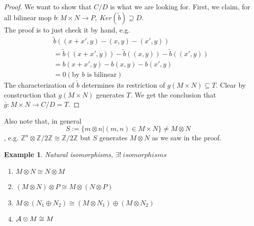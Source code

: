 \documentclass[11pt]{article}
\newtheorem{ex}[thm]{Example}
\newcommand{\intg}{\mathbb Z}
\newcommand{\cala}{{\cal A}}
\newcommand{\rta}{\rightarrow}
\begin{document}
\begin{proof}
We want to show that $C/D$ is what we are looking for. First, we claim, for all bilinear mop $ b:M\times N\rta P,\ Ker(\tilde{b})\supseteq D$.\\
The proof is to just check it by hand, e.g.
$$
\begin{aligned}
&\tilde{b}((x+x',y)-(x,y)-(x',y))\\
&=\tilde{b}((x+x',y))-\tilde{b}((x,y))-\tilde{b}((x',y))\\
&=b(x+x',y)-b(x,y)-b(x',y)\\
&=0(\text{by $b$ is bilinear})
\end{aligned}
$$
The characterization of $\tilde{b}$ determines its restriction of $g(M\times N)\subseteq T$. Clear by construction that $g(M\times N)$ generates $T$. We get the conclusion that $\bar{g}:M\times N\rta C/D=T$.
\end{proof}
Also note that, in general
$$
S:=\{m\otimes n|(m,n)\in M\times N\}\neq M\otimes N
$$, e.g. $\intg^n\otimes \intg/2\intg\cong \intg/2\intg$
but $S$ generates $M\otimes N$ as we saw in the proof.
\begin{ex}
Natural isomorphisms, $\exists !\ isomorphisms$
\begin{enumerate}
\item $M\otimes N\cong N\otimes M$
\item $(M\otimes N)\otimes P\cong M\otimes (N\otimes P)$
\item $M\otimes (N_1\oplus N_2)\cong (M\otimes N_1)\oplus (M\otimes N_2)$
\item $\cala\otimes M\cong M$
\end{enumerate}
\end{ex}
\end{document}
